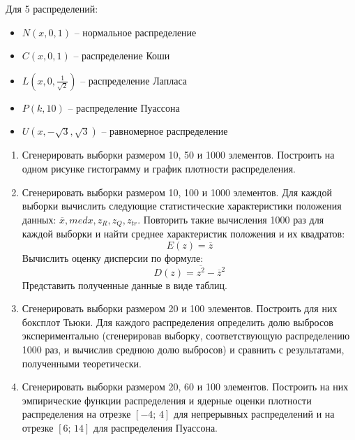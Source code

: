 \documentclass[../main.tex]{subfiles}
\begin{document}
    \noindent Для 5 распределений:
	\begin{itemize}
    	\item $N(x, 0, 1)$ -- нормальное распределение
	    \item $C(x, 0, 1)$ -- распределение Коши
    	\item $L(x, 0, \frac{1}{\sqrt{2}})$ -- распределение Лапласа 
    	\item $P(k, 10)$ -- распределение Пуассона
    	\item $U(x, -\sqrt{3}, \sqrt{3})$ -- равномерное распределение
	\end{itemize}

    \begin{enumerate}
        \item Сгенерировать выборки размером 10, 50 и 1000 элементов.
         \newline Построить на одном рисунке гистограмму и график плотности распределения.
    
         \item Сгенерировать выборки размером 10, 100 и 1000 элементов.
         Для каждой выборки вычислить следующие статистические характеристики положения данных: $\overline{x}, med  x, z_R, z_Q, z_{tr}.$ Повторить такие вычисления 1000 раз для каждой выборки и найти среднее характеристик положения и их квадратов:
        \begin{equation}
	        E(z) = \overline{z}
        \end{equation}
            Вычислить оценку дисперсии по формуле:
        \begin{equation}
	        D(z) = \overline{z^2} - \overline{z}^2
        \end{equation}
            Представить полученные данные в виде таблиц.
        \item Сгенерировать выборки размером 20 и 100 элементов.
        Построить для них боксплот Тьюки.
        Для каждого распределения определить долю выбросов экспериментально (сгенерировав выборку, соответствующую распределению 1000 раз, и вычислив среднюю долю выбросов) и сравнить с результатами, полученными теоретически.  
        \item Сгенерировать выборки размером 20, 60 и 100 элементов. Построить на них эмпирические функции распределения и ядерные оценки плотности распределения на отрезке $[-4;\,4]$ для непрерывных распределений и на отрезке $[6;\,14]$ для распределения Пуассона.
    \end{enumerate}
\end{document}
